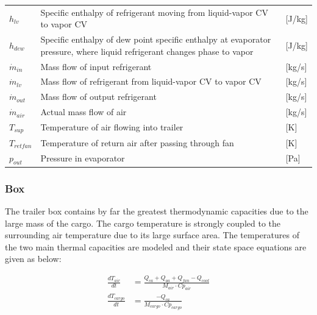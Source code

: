 \begin{center}
\begin{tabular}{l p{10cm} l}
		$h_{lv} $					& Specific enthalpy of refrigerant moving from liquid-vapor CV to vapor CV						& [\si{J}/\si{kg}] \\
		$h_{dew}$					& Specific enthalpy of dew point specific enthalpy at evaporator pressure, where liquid refrigerant changes phase to vapor		& [\si{J}/\si{kg}] 		\\
		$\dot{m}_{in} $				& Mass flow of input refrigerant 							& [\si{kg}/\si{s}] \\
		$\dot{m}_{lv} $				& Mass flow of refrigerant from liquid-vapor CV to vapor CV	& [\si{kg}/\si{s}] \\
		$\dot{m}_{out} $			& Mass flow of output refrigerant							& [\si{kg}/\si{s}] \\
		$\dot{m}_{air}$				& Actual mass flow of air									& [\si{kg}/\si{s}] \\
		$T_{sup} $					& Temperature of air flowing into trailer					& [\si{K}] \\
		$T_{retfan}$				& Temperature of return air after passing through fan		& [\si{K}] \\
		$ p_{out} 	$				& Pressure in evaporator									& [\si{Pa}] \\
	\end{tabular}
\end{center}


\subsubsection{Box}
The trailer box contains by far the greatest thermodynamic capacities due to the large mass of the cargo. The cargo temperature is strongly coupled to the surrounding air temperature due to its large surface area. The temperatures of the two main thermal capacities are modeled and their state space equations are given as below:

\begin{align}
	\frac{dT_{air}}{dt} & = \frac{Q_{ca} + Q_{aa} + Q_{fan} -Q_{cool}}{M_{air} \cdot Cp_{air}} \\
	\frac{dT_{cargo}}{dt} & = \frac{-Q_{ca}}{M_{cargo} \cdot Cp_{cargo}}
\end{align}


